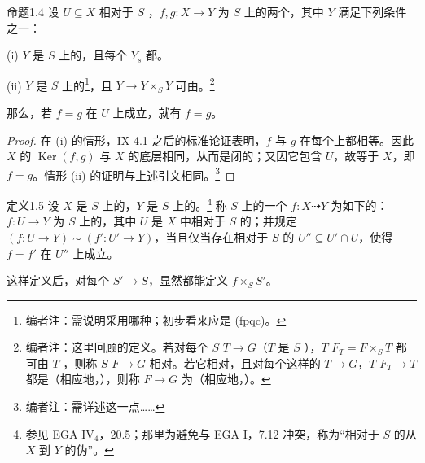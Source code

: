 \begin{SGAresult}{命题}{1.4}
设 $U\subseteq X$ 相对于 $S$ ，$f,g:X\to Y$ 为 $S$ 上的两个，其中 $Y$ 满足下列条件之一：

(i) $Y$ 是 $S$ 上的，且每个 $Y_s$ 都。

(ii) $Y$ 是 $S$ 上的\footnote{编者注：需说明采用哪种；初步看来应是 (fpqc)。}，且 $Y\to Y\times_S Y$ 可由。\footnote{编者注：这里回顾的定义。若对每个 $S$  $T\to G$（$T$ 是 $S$ ），$T$  $F_T=F\times_S T$ 都可由 $T$ ，则称 $S$  $F\to G$ 相对。若它相对，且对每个这样的 $T\to G$，$T$  $F_T\to T$ 都是（相应地，），则称 $F\to G$ 为（相应地，）。}

那么，若 $f=g$ 在 $U$ 上成立，就有 $f=g$。
\end{SGAresult}
\begin{proof}
在 (i) 的情形，IX 4.1 之后的标准论证表明，$f$ 与 $g$ 在每个上都相等。因此 $X$ 的 $\operatorname{Ker}(f,g)$ 与 $X$ 的底层相同，从而是闭的；又因它包含 $U$，故等于 $X$，即 $f=g$。情形 (ii) 的证明与上述引文相同。\footnote{编者注：需详述这一点……}
\end{proof}
\begin{SGAresult}{定义}{1.5}
设 $X$ 是 $S$ 上的，$Y$ 是 $S$ 上的。\footnote{参见 EGA IV$_4$，20.5；那里为避免与 EGA I，7.12 冲突，称为“相对于 $S$ 的从 $X$ 到 $Y$ 的伪”。} 称 $S$ 上的一个 $f:X\dashrightarrow Y$ 为如下的：
$f:U\to Y$ 为 $S$ 上的，其中 $U$ 是 $X$ 中相对于 $S$ 的；并规定 $(f:U\to Y)\sim(f':U'\to Y)$，当且仅当存在相对于 $S$ 的 $U''\subseteq U'\cap U$，使得 $f=f'$ 在 $U''$ 上成立。
\end{SGAresult}
这样定义后，对每个 $S'\to S$，显然都能定义 $f\times_S S'$。

